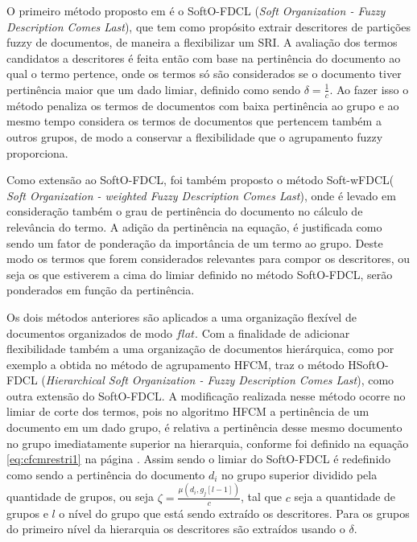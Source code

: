 O primeiro método proposto em \cite{Nogueira2013} é o SoftO-FDCL (\textit{Soft Organization - Fuzzy Description Comes
Last\/}), que tem como propósito extrair descritores de partições fuzzy de documentos, de maneira a
flexibilizar um SRI. A avaliação dos termos candidatos a descritores é feita então com base na
pertinência do documento ao qual o termo pertence, onde os termos só são considerados se o documento
tiver pertinência maior que um dado limiar, definido como sendo 
$\delta = \frac{1}{c}$. Ao fazer isso o método penaliza os termos de
documentos com baixa pertinência ao grupo e ao mesmo tempo considera os termos de documentos que
pertencem também a outros grupos, de modo a conservar a flexibilidade que o agrupamento fuzzy
proporciona. 

Como extensão ao SoftO-FDCL, foi também proposto o método Soft-wFDCL(\textit{ Soft
Organization - weighted Fuzzy Description Comes Last\/}), onde é levado em consideração também o
grau de pertinência do documento no cálculo de relevância do termo. A adição da pertinência na
equação, é justificada como sendo um fator de ponderação da importância de um termo ao grupo. Deste
modo os termos que forem considerados relevantes para compor os descritores, ou seja os que
estiverem a cima do limiar definido no método SoftO-FDCL, serão ponderados em função da pertinência.

Os dois métodos anteriores são aplicados a uma organização flexível de documentos organizados de
modo $flat$. Com a finalidade de adicionar flexibilidade também a uma organização de
documentos hierárquica, como por exemplo a obtida no método de
agrupamento HFCM, \cite{Nogueira2013} traz o método HSoftO-FDCL (\textit{Hierarchical Soft
Organization - Fuzzy Description Comes Last\/}), como outra extensão do SoftO-FDCL. 
A modificação realizada nesse método ocorre no limiar de corte dos termos, pois no algoritmo HFCM a
pertinência de um documento em um dado grupo, é relativa a pertinência desse mesmo documento no
grupo imediatamente superior na hierarquia, conforme foi definido na equação \ref{eq:cfcmrestri1} na
página \pageref{eq:cfcmrestri1}. Assim sendo o limiar do SoftO-FDCL é redefinido como
sendo a pertinência do documento $d_i$ no grupo superior dividido pela quantidade de grupos, ou seja
$\zeta = \frac{\mu(d_i,g_j[l-1])}{c}$, tal que $c$ seja a quantidade de grupos e $l$ o nível do
grupo que está sendo extraído os descritores. Para os grupos do primeiro nível da hierarquia os
descritores são extraídos usando o $\delta$. 


